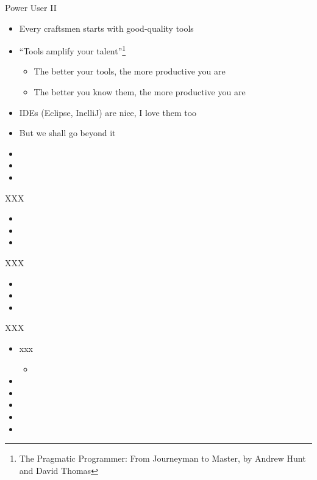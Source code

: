 \begin{frame}[fragile]{Power User II}
\begin{itemize}
\item Every craftsmen starts with good-quality tools
\item ``Tools amplify your talent''\footnote{The Pragmatic Programmer: From Journeyman to Master, by Andrew Hunt and David Thomas}
\begin{itemize}
\item The better your tools, the more productive you are
\item The better you know them, the more productive you are
\end{itemize}
\item IDEs (Eclipse, InelliJ) are nice, I love them too
\item But we shall go beyond it
\item
\item
\item
\end{itemize}
\end{frame}

\begin{frame}[fragile]{XXX}
\begin{itemize}
\item
\item
\item
\end{itemize}
\end{frame}

\begin{frame}[fragile]{XXX}
\begin{itemize}
\item
\item
\item
\end{itemize}
\end{frame}


\begin{frame}[fragile]{XXX}
\begin{itemize}
\item xxx
\begin{itemize}
\item
\end{itemize}
\item
\item
\item
\item
\item
\end{itemize}
\end{frame}


